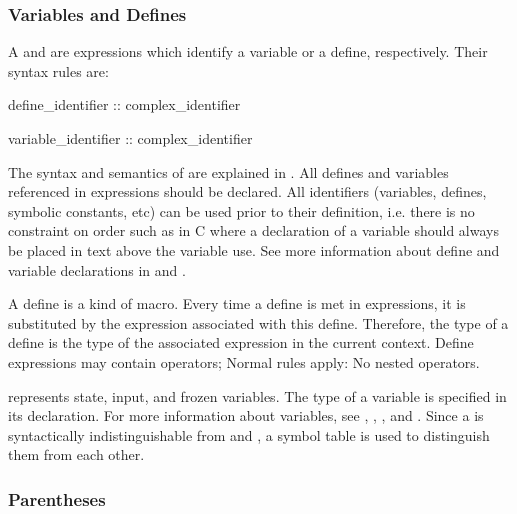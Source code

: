 \subsubsection{Variables and Defines}
\label{Variables and Defines}

A  and  are
expressions which identify a variable or a define, respectively.
%
Their syntax rules are:

\begin{Grammar}
define_identifier :: complex_identifier

variable_identifier :: complex_identifier
\end{Grammar}
%
The syntax and semantics of  are explained
in .
%
All defines and variables referenced in expressions should be
declared. All identifiers (variables, defines, symbolic constants,
etc) can be used prior to their definition, i.e. there is no constraint on
order such as in C where a declaration of a variable should always be
placed in text above the variable use.
%
See more information about define and variable declarations in
 and .

A define is a kind of macro.
%
Every time a define is met in expressions, it is substituted by the
expression associated with this define.
%
Therefore, the type of a define is the type of the associated
expression in the current context.
%
Define expressions may contain  operators; Normal rules
apply: No nested  operators.

 represents state, input, and frozen
variables.
%
The type of a variable is specified in its declaration.
%
For more information about variables, see , , , and
.
%
Since a  is syntactically indistinguishable
from  and
, a symbol table is used to distinguish
them from each other.

\subsubsection{Parentheses}
\label{Parentheses}

